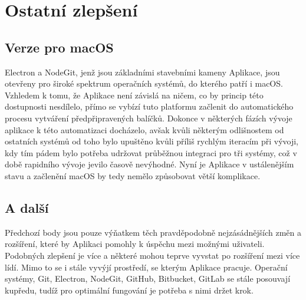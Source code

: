 \section{Ostatní zlepšení}

\subsection{Verze pro macOS}

Electron a NodeGit, jenž jsou základními stavebními kameny Aplikace, jsou otevřeny pro široké spektrum operačních systémů, do kterého patří i macOS. Vzhledem k tomu, že Aplikace není závislá na ničem, co by princip této dostupnosti nesdílelo, přímo se vybízí tuto platformu začlenit do automatického procesu vytváření předpřipravených balíčků. Dokonce v některých fázích vývoje aplikace k této automatizaci docházelo, avšak kvůli některým odlišnostem od ostatních systémů od toho bylo upuštěno kvůli příliš rychlým iteracím při vývoji, kdy tím pádem bylo potřeba udržovat průběžnou integraci pro tři systémy, což v době rapidního vývoje jevilo časově nevýhodné. Nyní je Aplikace v ustálenějším stavu a začlenění macOS by tedy nemělo způsobovat větší komplikace.

\subsection{A další}

Předchozí body jsou pouze výňatkem těch pravděpodobně nejzásádnějších změn a rozšíření, které by Aplikaci pomohly k úspěchu mezi možnými uživateli. Podobných zlepšení je více a některé mohou teprve vyvstat po rozšíření mezi více lídí. Mimo to se i stále vyvýjí prostředí, se kterým Aplikace pracuje. Operační systémy, Git, Electron, NodeGit, GitHub, Bitbucket, GitLab se stále posouvají kupředu, tudíž pro optimální fungování je potřeba s nimi držet krok.
